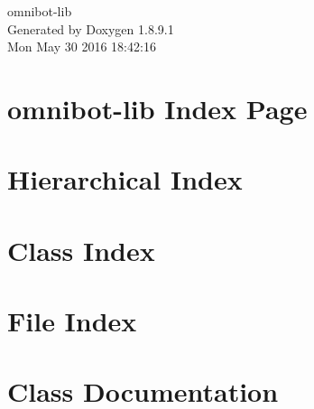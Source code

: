 \documentclass[twoside]{book}
\newcommand{\+}{\discretionary{\mbox{\scriptsize$\hookleftarrow$}}{}{}}
\newcommand{\clearemptydoublepage}{%
  \newpage{\pagestyle{empty}\cleardoublepage}%
}
\begin{document}
\hypersetup{pageanchor=false,
             bookmarks=true,
             bookmarksnumbered=true,
             pdfencoding=unicode
            }
\begin{titlepage}
\vspace*{7cm}
\begin{center}%
{\Large omnibot-\/lib }\\
\vspace*{1cm}
{\large Generated by Doxygen 1.8.9.1}\\
\vspace*{0.5cm}
{\small Mon May 30 2016 18:42:16}\\
\end{center}
\end{titlepage}
\clearemptydoublepage
\tableofcontents
\clearemptydoublepage
{}
\hypersetup{pageanchor=true}

\chapter{omnibot-\/lib Index Page}
\label{index}\hypertarget{index}{}
\chapter{Hierarchical Index}

\chapter{Class Index}

\chapter{File Index}

\chapter{Class Documentation}























\end{document}
